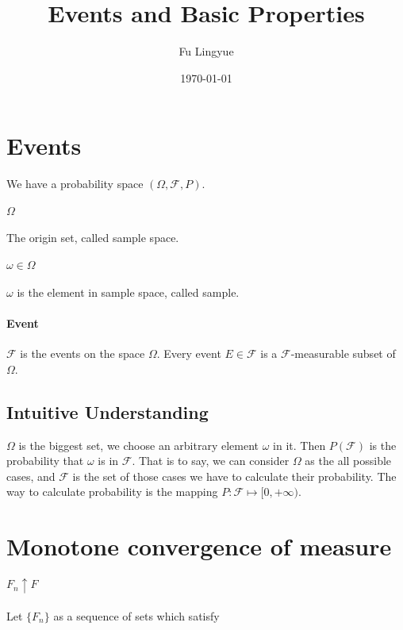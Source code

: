 
\author{Fu Lingyue}
\title{Events and Basic Properties}
\date{\today}


\maketitle
\section{Events}
We have a probability space $(\Omega,\mathcal F, P).$

\paragraph{$\Omega$} The origin set,  called sample space.
\paragraph{$\omega\in \Omega$}  $\omega$ is the element in  sample space, called sample.

\paragraph{Event} $\mathcal F$  is the events on the space $\Omega$. Every event $E\in \mathcal F$ is a $\mathcal F$-measurable subset of $\Omega$.

\subsection{Intuitive Understanding}
$\Omega$ is the biggest set, we choose an arbitrary element $\omega$ in it. Then $P(\mathcal F)$ is the probability that $\omega$ is in $\mathcal F$.
That is to say, we can consider $\Omega$ as the all possible cases, and $\mathcal F$ is the set of those cases we have to calculate their probability. The way to calculate probability is the mapping $P: \mathcal F\mapsto [0,+\infty)$.

\section{Monotone convergence of measure}
 
\paragraph{$F_n \uparrow F$} Let $\{F_n\}$ as a sequence of sets which satisfy 

